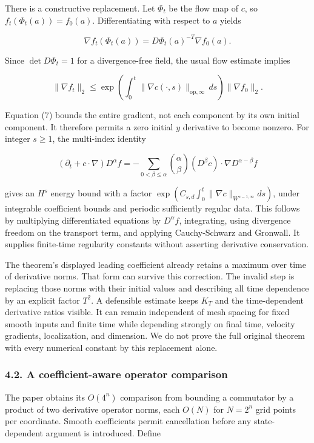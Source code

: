 There is a constructive replacement. Let \(\Phi_t\) be the flow map of
\(c\), so \(f_t(\Phi_t(a))=f_0(a)\). Differentiating with respect to
\(a\) yields

\[
\nabla f_t(\Phi_t(a))=D\Phi_t(a)^{-T}\nabla f_0(a). \tag{6}
\]

Since \(\det D\Phi_t=1\) for a divergence-free field, the usual flow
estimate implies

\[
\|\nabla f_t\|_2\leq
\exp\!\left(\int_0^t\|\nabla c(\cdot,s)\|_{\mathrm{op},\infty}\,ds\right)
\|\nabla f_0\|_2. \tag{7}
\]

Equation (7) bounds the entire gradient, not each component by its own
initial component. It therefore permits a zero initial \(y\) derivative
to become nonzero. For integer \(s\geq1\), the multi-index identity

\[
(\partial_t+c\cdot\nabla)D^\alpha f
=-\sum_{0<\beta\leq\alpha}{\alpha\choose\beta}
(D^\beta c)\cdot\nabla D^{\alpha-\beta}f \tag{8}
\]

gives an \(H^s\) energy bound with a factor
\(\exp(C_{s,d}\int_0^t\|\nabla c\|_{W^{s-1,\infty}}ds)\), under
integrable coefficient bounds and periodic sufficiently regular data.
This follows by multiplying differentiated equations by \(D^\alpha f\),
integrating, using divergence freedom on the transport term, and
applying Cauchy-Schwarz and Gronwall. It supplies finite-time regularity
constants without asserting derivative conservation.

The theorem's displayed leading coefficient already retains a maximum
over time of derivative norms. That form can survive this correction.
The invalid step is replacing those norms with their initial values and
describing all time dependence by an explicit factor \(T^2\). A
defensible estimate keeps \(K_T\) and the time-dependent derivative
ratios visible. It can remain independent of mesh spacing for fixed
smooth inputs and finite time while depending strongly on final time,
velocity gradients, localization, and dimension. We do not prove the
full original theorem with every numerical constant by this replacement
alone.

\subsubsection{4.2. A coefficient-aware operator
comparison}\label{a-coefficient-aware-operator-comparison}

The paper obtains its \(O(4^n)\) comparison from bounding a commutator
by a product of two derivative operator norms, each \(O(N)\) for
\(N=2^n\) grid points per coordinate. Smooth coefficients permit
cancellation before any state-dependent argument is introduced. Define

